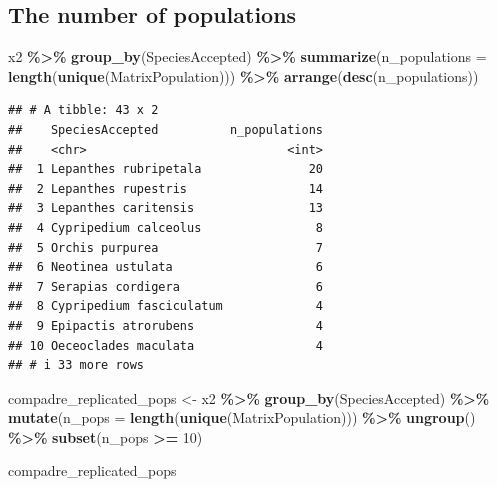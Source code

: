 \documentclass[
]{book}
\newenvironment{Shaded}{\begin{snugshade}}{\end{snugshade}}
\newcommand{\AttributeTok}[1]{\textcolor[rgb]{0.13,0.29,0.53}{#1}}
\newcommand{\DecValTok}[1]{\textcolor[rgb]{0.00,0.00,0.81}{#1}}
\newcommand{\FunctionTok}[1]{\textcolor[rgb]{0.13,0.29,0.53}{\textbf{#1}}}
\newcommand{\NormalTok}[1]{#1}
\newcommand{\OtherTok}[1]{\textcolor[rgb]{0.56,0.35,0.01}{#1}}
\newcommand{\SpecialCharTok}[1]{\textcolor[rgb]{0.81,0.36,0.00}{\textbf{#1}}}
\theoremstyle{definition}
\theoremstyle{definition}
\theoremstyle{definition}
\theoremstyle{definition}
\theoremstyle{remark}
\begin{document}
\subsection{The number of populations}\label{the-number-of-populations}

\begin{Shaded}
\begin{Highlighting}[]
\NormalTok{x2 }\SpecialCharTok{\%\textgreater{}\%} 
  \FunctionTok{group\_by}\NormalTok{(SpeciesAccepted) }\SpecialCharTok{\%\textgreater{}\%} 
  \FunctionTok{summarize}\NormalTok{(}\AttributeTok{n\_populations =} \FunctionTok{length}\NormalTok{(}\FunctionTok{unique}\NormalTok{(MatrixPopulation))) }\SpecialCharTok{\%\textgreater{}\%} 
  \FunctionTok{arrange}\NormalTok{(}\FunctionTok{desc}\NormalTok{(n\_populations))}
\end{Highlighting}
\end{Shaded}

\begin{verbatim}
## # A tibble: 43 x 2
##    SpeciesAccepted          n_populations
##    <chr>                            <int>
##  1 Lepanthes rubripetala               20
##  2 Lepanthes rupestris                 14
##  3 Lepanthes caritensis                13
##  4 Cypripedium calceolus                8
##  5 Orchis purpurea                      7
##  6 Neotinea ustulata                    6
##  7 Serapias cordigera                   6
##  8 Cypripedium fasciculatum             4
##  9 Epipactis atrorubens                 4
## 10 Oeceoclades maculata                 4
## # i 33 more rows
\end{verbatim}

\begin{Shaded}
\begin{Highlighting}[]
\NormalTok{compadre\_replicated\_pops }\OtherTok{\textless{}{-}}\NormalTok{ x2 }\SpecialCharTok{\%\textgreater{}\%} 
  \FunctionTok{group\_by}\NormalTok{(SpeciesAccepted) }\SpecialCharTok{\%\textgreater{}\%} 
  \FunctionTok{mutate}\NormalTok{(}\AttributeTok{n\_pops =} \FunctionTok{length}\NormalTok{(}\FunctionTok{unique}\NormalTok{(MatrixPopulation))) }\SpecialCharTok{\%\textgreater{}\%} 
  \FunctionTok{ungroup}\NormalTok{() }\SpecialCharTok{\%\textgreater{}\%}
  \FunctionTok{subset}\NormalTok{(n\_pops }\SpecialCharTok{\textgreater{}=} \DecValTok{10}\NormalTok{)}

\NormalTok{compadre\_replicated\_pops}
\end{Highlighting}
\end{Shaded}
\end{document}
